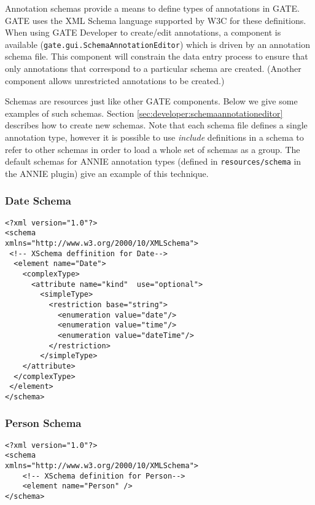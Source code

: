 Annotation schemas provide a means to define types of annotations in GATE.
GATE uses the XML Schema language supported by W3C for these definitions.
When using GATE Developer to
create/edit annotations, a component is available
({\tt gate.gui.SchemaAnnotationEditor}) which is
driven by an annotation schema file. This component will constrain the data
entry process to ensure that only annotations that correspond to a particular
schema are created. (Another component allows unrestricted annotations to be
created.)

Schemas are resources just like other GATE components. Below we give some
examples of such schemas. Section \ref{sec:developer:schemaannotationeditor}
describes how to create new schemas.  Note that each schema file defines a
single annotation type, however it is possible to use \emph{include}
definitions in a schema to refer to other schemas in order to load a whole set
of schemas as a group.  The default schemas for ANNIE annotation types (defined
in \verb!resources/schema! in the ANNIE plugin) give an example of this
technique.

\small
\subsubsection*{Date Schema}
\begin{small}
\begin{verbatim}
<?xml version="1.0"?>
<schema
xmlns="http://www.w3.org/2000/10/XMLSchema">
 <!-- XSchema deffinition for Date-->
  <element name="Date">
    <complexType>
      <attribute name="kind"  use="optional">
        <simpleType>
          <restriction base="string">
            <enumeration value="date"/>
            <enumeration value="time"/>
            <enumeration value="dateTime"/>
          </restriction>
        </simpleType>
    </attribute>
  </complexType>
 </element>
</schema>
\end{verbatim}
\end{small}

\subsubsection*{Person Schema}
\begin{small}
\begin{verbatim}
<?xml version="1.0"?>
<schema
xmlns="http://www.w3.org/2000/10/XMLSchema">
    <!-- XSchema definition for Person-->
    <element name="Person" />
</schema>
\end{verbatim}
\end{small}

